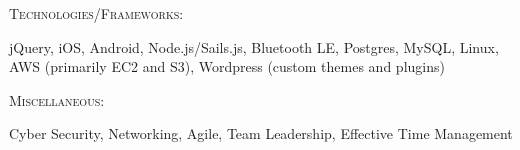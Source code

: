 \documentclass[letterpaper]{article} %
\begin{document}
\noindent\begin{large}\textsc{Technologies/Frameworks:}\end{large}
jQuery, iOS, Android, Node.js/Sails.js, Bluetooth LE, Postgres, MySQL, Linux, AWS (primarily EC2 and S3), Wordpress (custom themes and plugins)

\noindent\begin{large}\textsc{Miscellaneous:}\end{large} Cyber Security, Networking, Agile, Team Leadership, Effective Time Management
\end{document}
